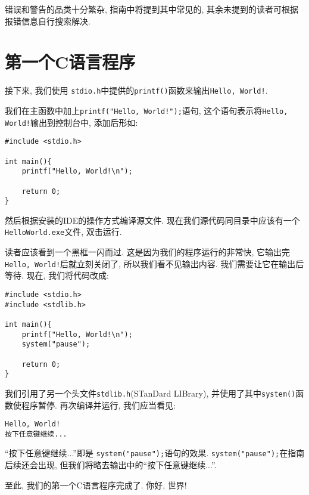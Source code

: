         错误和警告的品类十分繁杂, 指南中将提到其中常见的, 其余未提到的读者可根据报错信息自行搜索解决.

    \section{第一个C语言程序} \label{第一个C语言程序}
        接下来, 我们使用 \texttt{stdio.h}中提供的\texttt{printf()}函数来输出\texttt{Hello, World!}.

        我们在主函数中加上\texttt{printf("Hello, World!");}语句, 这个语句表示将\texttt{Hello, World!}输出到控制台中, 添加后形如:
\begin{lstlisting}
#include <stdio.h>

int main(){
    printf("Hello, World!\n");

    return 0;
}
\end{lstlisting}

        然后根据安装的IDE的操作方式编译源文件. 现在我们源代码同目录中应该有一个\texttt{HelloWorld.exe}文件, 双击运行.

        读者应该看到一个黑框一闪而过. 这是因为我们的程序运行的非常快, 它输出完\texttt{Hello, World!}后就立刻关闭了, 所以我们看不见输出内容. 我们需要让它在输出后等待. 现在, 我们将代码改成:
\begin{lstlisting}
#include <stdio.h>
#include <stdlib.h>

int main(){
    printf("Hello, World!\n");
    system("pause");

    return 0;
}
\end{lstlisting}

        我们引用了另一个头文件\texttt{stdlib.h}(STanDard LIBrary), 并使用了其中\texttt{system()}函数使程序暂停. 再次编译并运行, 我们应当看见:
\begin{lstlisting}
Hello, World!
按下任意键继续...
\end{lstlisting}

        ``按下任意键继续...''即是 \texttt{system("pause");}语句的效果. \texttt{system("pause");}在指南后续还会出现, 但我们将略去输出中的``按下任意键继续...''. 
        
        至此, 我们的第一个C语言程序完成了. 你好, 世界!

    \vspace*{20pt}
    \sumrule
